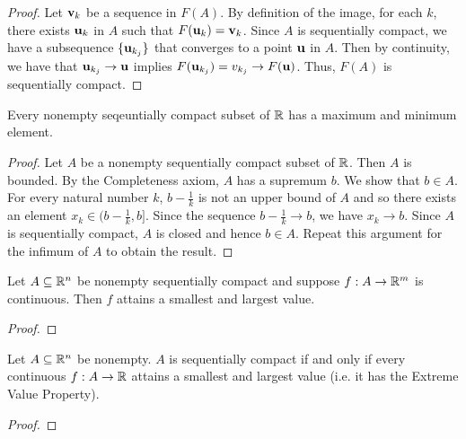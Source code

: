 \documentclass[letterpaper, twoside, 12pt]{book}
\begin{document}
\begin{proof}
    Let \(\mathbf v_k\) be a sequence in \(F(A)\). By definition of 
    the image, for each \(k\), there exists \(\mathbf u_k\) in \(A\)
    such that \(F(\mathbf u_k) = \mathbf v_k\). Since \(A\) is sequentially
    compact, we have a subsequence \(\{\mathbf u_{k_j}\}\) that converges
    to a point \(\mathbf u\) in \(A\). Then by continuity, we have
    that \(\mathbf u_{k_j} \to \mathbf u\) implies 
    \(F(\mathbf u_{k_j}) = v_{k_j} \to F(\mathbf u)\). Thus, \(F(A)\) is 
    sequentially compact.
\end{proof}

\begin{lemma}[11.21]
  Every nonempty seqeuntially compact subset of \(\mathbb R\) has a
  maximum and minimum element.
\end{lemma}

\begin{proof}
    Let \(A\) be a nonempty sequentially compact subset of \(\mathbb R\).
    Then \(A\) is bounded. By the Completeness axiom, \(A\) has a
    supremum \(b\). We show that \(b \in A\). For every natural number
    \(k\), \(b - \frac{1}{k}\) is not an upper bound of \(A\) and so
    there exists an element \(x_k \in (b - \frac{1}{k}, b]\). Since
    the sequence \(b - \frac{1}{k} \to b\), we have \(x_k \to b\).
    Since \(A\) is sequentially compact, \(A\) is closed and hence
    \(b \in A\). Repeat this argument for the infimum of \(A\) to 
    obtain the result.
\end{proof}

\begin{theorem}
  Let \(A\subseteq\mathbb R^n\) be nonempty sequentially compact
  and suppose \(f:A\to\mathbb R^m\) is continuous.
  Then \(f\) attains a smallest and largest value.
\end{theorem}
\begin{proof}

\end{proof}

\begin{theorem}[11.24]
  Let \(A\subseteq\mathbb R^n\) be nonempty.
  \(A\) is sequentially compact if and only if
  every continuous \(f:A\to\mathbb R\) attains a smallest and largest value
  (i.e. it has the Extreme Value Property).
\end{theorem}
\begin{proof}

\end{proof}
\end{document}
